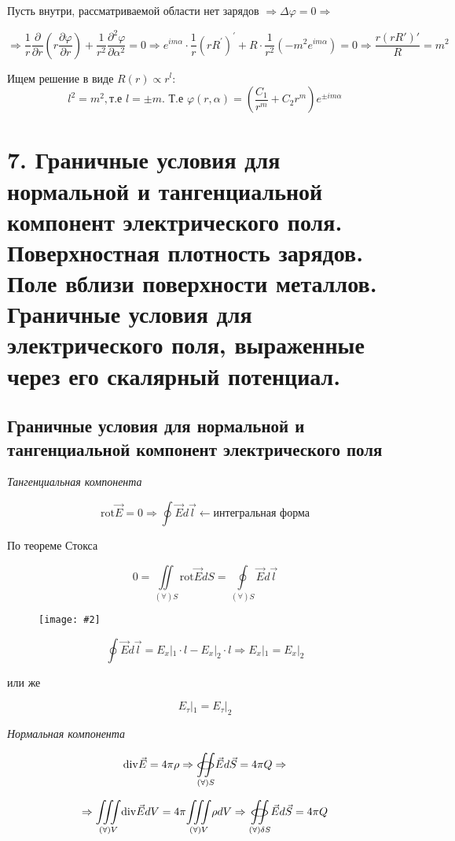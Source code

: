 \documentclass[a4paper,12pt]{article}
\newcommand{\kr}[1]{\textit{#1}}
\newcommand{\fc}[1]{\[#1\]}
\newcommand{\mm}[1]{\mathrm{#1}}
\newcommand{\oiint}{%
  \mathchoice%
    {\mathop{\raisebox{0.1ex}{\scalebox{1.7}[0.7]{\(\bigcirc\)}}}%
     \!\!\!\!\!\!\!\!\!\!\!\int\!\!\!\int}%
    {\mathop{\raisebox{0.3ex}{\scalebox{1.}[0.5]{\(\bigcirc\)}}}%
     \!\!\!\!\!\!\!\int\!\!\!\int}%
    {\mathop{\raisebox{0.1ex}{\scalebox{1}[0.8]{\(\bigcirc\)}}}%
     \!\!\!\!\!\!\!\!\!\int\!\!\!\int}%
    {\mathop{\raisebox{0.05ex}{\scalebox{0.8}[0.8]{\(\bigcirc\)}}}%
     \!\!\!\!\!\!\!\!\int\!\!\!\int}%
}
\newcommand{\imc}[2][0.7\textwidth]{%
    \begin{figure}[h!]
        \centering
        \texttt{[image: \#2]}
    \end{figure}%
}
\begin{document}
Пусть внутри, рассматриваемой области нет зарядов $\Rightarrow \Delta \varphi=0 \Rightarrow$

\fc{\Rightarrow \frac{1}{r} \frac{\partial}{\partial r}\left(r \frac{\partial \varphi}{\partial r}\right)+\frac{1}{r^2} \frac{\partial^2 \varphi}{\partial \alpha^2}=0 \Rightarrow e^{i m \alpha} \cdot \frac{1}{r}\left(r R^{\prime}\right)^{\prime}+R \cdot \frac{1}{r^2}\left(-m^2 e^{i m \alpha}\right)=0 \Rightarrow \frac{r(rR')'}{R}=m^2}

Ищем решение в виде $R(r)\varpropto r^l$:
\fc{l^2=m^2 ,\text{т.е }l=\pm m \text{. Т.е } \varphi(r,\alpha)=\left(\frac{C_1}{r^m}+C_2r^m\right)e^{\pm im\alpha}}

\section*{7. Граничные условия для нормальной и тангенциальной компонент
электрического поля. Поверхностная плотность зарядов. Поле вблизи
поверхности металлов. Граничные условия для электрического поля,
выраженные через его скалярный потенциал.}

\subsection*{Граничные условия для нормальной и тангенциальной компонент
электрического поля}

\kr{Тангенциальная компонента}

\fc{\mm{rot}\vec{E}=0 \Rightarrow \oint \vec{E}d\vec{l}\leftarrow \text{интегральная форма}}

По теореме Стокса

\fc{0=\underset{(\forall )S}{\iint} \mm{rot}\vec{E}dS=\underset{(\forall )S}{\oint }\vec{E}d\vec{l}}

\imc[0.826\textwidth]{10.png} 

\newpage


\fc{\oint \vec{E}d\vec{l}=E_x|_1\cdot l-E_x|_2\cdot l\Rightarrow E_x|_1=E_x|_2}

или же 

\fc{E_\tau|_1=E_\tau|_2}

\kr{Нормальная компонента}

\fc{\mm{div}\vec{E}=4\pi \rho \Rightarrow \underset{(\forall)S}{\oiint}\vec{E}d\vec{S}=4\pi Q \Rightarrow}

\fc{\Rightarrow \underset{(\forall)V}{\iiint} \mm{div}\vec{E}dV=4\pi \underset{(\forall)V}{\iiint} \rho dV \Rightarrow \underset{(\forall)\delta S}{\oiint}\vec{E}d\vec{S}=4\pi Q }
\end{document}
